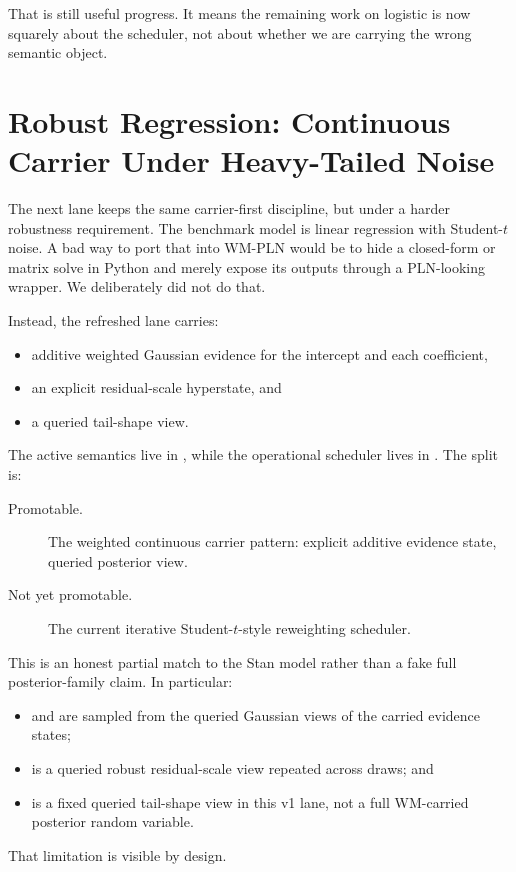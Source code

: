 \documentclass[11pt,openany]{report}
\begin{document}
\noindent
That is still useful progress.  It means the remaining work on logistic is now
squarely about the scheduler, not about whether we are carrying the wrong
semantic object.

\section{Robust Regression: Continuous Carrier Under Heavy-Tailed Noise}
\label{app:pplbench-robust-regression}

The next lane keeps the same carrier-first discipline, but under a harder
robustness requirement.  The benchmark model
 is linear regression with
Student-\(t\) noise.  A bad way to port that into WM-PLN would be to hide a
closed-form or matrix solve in Python and merely expose its outputs through a
PLN-looking wrapper.  We deliberately did not do that.

Instead, the refreshed lane carries:
\begin{itemize}
\item additive weighted Gaussian evidence for the intercept and each
coefficient,
\item an explicit residual-scale hyperstate, and
\item a queried tail-shape view.
\end{itemize}
The active semantics live in
,
while the operational scheduler lives in
.  The split is:
\begin{description}
\item[Promotable.] The weighted continuous carrier pattern:
explicit additive evidence state, queried posterior view.
\item[Not yet promotable.] The current iterative Student-\(t\)-style
reweighting scheduler.
\end{description}

This is an honest partial match to the Stan model rather than a fake full
posterior-family claim.  In particular:
\begin{itemize}
\item {} and  are sampled from the queried Gaussian views
of the carried evidence states;
\item {} is a queried robust residual-scale view repeated across
draws; and
\item {} is a fixed queried tail-shape view in this v1 lane, not a full
WM-carried posterior random variable.
\end{itemize}
That limitation is visible by design.
\end{document}
